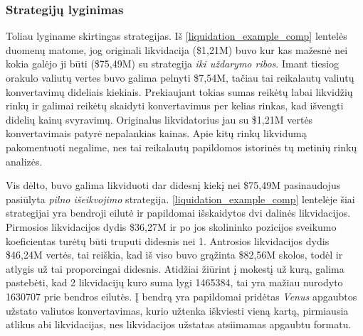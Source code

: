\documentclass{VUMIFPSkursinis}
\begin{document}
\subsubsection{Strategijų lyginimas}

Toliau lyginame skirtingas strategijas. Iš \ref{liquidation_example_comp} lentelės duomenų matome, jog originali likvidacija (\$1,21M) buvo kur kas mažesnė nei kokia galėjo ji būti (\$75,49M) su strategija \textit{iki uždarymo ribos}. Imant tiesiog orakulo valiutų vertes buvo galima pelnyti \$7,54M, tačiau tai reikalautų valiutų konvertavimų dideliais kiekiais. Prekiaujant tokias sumas reikėtų labai likvidžių rinkų ir galimai reikėtų skaidyti konvertavimus per kelias rinkas, kad išvengti didelių kainų svyravimų. Originalus likvidatorius jau su \$1,21M vertės konvertavimais patyrė nepalankias kainas. Apie kitų rinkų likvidumą pakomentuoti negalime, nes tai reikalautų papildomos istorinės tų metinių rinkų analizės.

Vis dėlto, buvo galima likviduoti dar didesnį kiekį nei \$75,49M pasinaudojus pasiūlyta \textit{pilno išeikvojimo} strategija. \ref{liquidation_example_comp} lentelėje šiai strategijai yra bendroji eilutė ir papildomai išskaidytos dvi dalinės likvidacijos. Pirmosios likvidacijos dydis \$36,27M ir po jos skolininko pozicijos sveikumo koeficientas turėtų būti truputi didesnis nei 1. Antrosios likvidacijos dydis \$46,24M vertės, tai reiškia, kad iš viso buvo grąžinta \$82,56M skolos, todėl ir atlygis už tai proporcingai didesnis. Atidžiai žiūrint į mokestį už kurą, galima pastebėti, kad 2 likvidacijų kuro suma lygi 1465384, tai yra mažiau nurodyto 1630707 prie bendros eilutės. Į bendrą yra papildomai pridėtas \textit{Venus} apgaubtos užstato valiutos konvertavimas, kurio užtenka iškviesti vieną kartą, pirmiausia atlikus abi likvidacijas, nes likvidacijos užstatas atsiimamas apgaubtu formatu.
\end{document}
